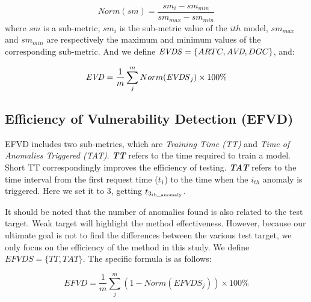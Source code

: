 \begin{equation}
Norm(sm) = \frac{sm_i - sm_{min}}{sm_{max}-sm_{min}}
\end{equation}
where $sm$ is a sub-metric, $sm_i$ is the sub-metric value of the $ith$ model, ${{sm}_{max}}$ and ${{sm}_{min}}$ are respectively the maximum and minimum values of the corresponding sub-metric. And we define $ {\it EVDS} =\{ARTC, \textit{AVD}, DGC\}$, and:

\begin{equation}
 {\it EVD} = \frac{1}{m}\sum_{j}^{m}Norm({\it EVDS}_j)\times100\%
\end{equation}

\subsection{\textbf{Efficiency of Vulnerability Detection (EFVD)}}
EFVD includes two sub-metrics, which are \textit{Training Time (TT)} and \textit{Time of Anomalies Triggered (TAT)}. \textit{\textbf{TT}} refers to the time required to train a model. Short TT correspondingly improves the efficiency of testing. \textit{\textbf{TAT}} refers to the time interval from the first request time (${t_1}$) to the time when the $i_{th}$ anomaly is triggered. Here we set it to 3, getting ${t_{{3_{{\rm{th\_anomaly}}}}}}$. 

It should be noted that the number of anomalies found is also related to the test target. Weak target will highlight the method effectiveness. However, because our ultimate goal is not to find the differences between the various test target, we only focus on the efficiency of the method in this study. We define $ \textit{EFVDS}=\{TT, TAT\}$. The specific formula is as follows:

\begin{equation}
 \textit{EFVD} = \frac{1}{m}\sum_{j}^{m}(1-Norm(\textit{EFVDS}_j))\times100\%
\end{equation}

